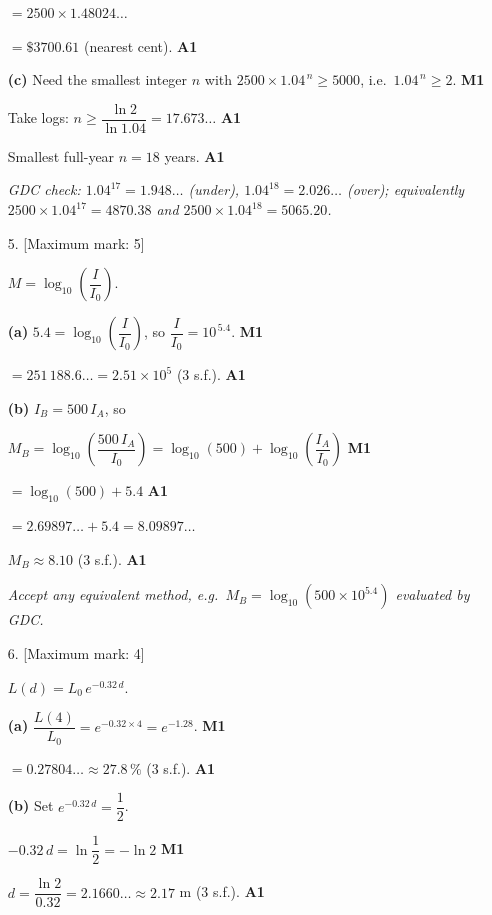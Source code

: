 \documentclass[12pt, twoside]{article}
\begin{document}
\begin{enumerate}[itemsep=0.3cm]
$= 2500 \times 1.48024\ldots$

$= \$3700.61$ (nearest cent). \hfill \textbf{A1}

\medskip

\textbf{(c)} Need the smallest integer $n$ with
$2500 \times 1.04^{\,n} \ge 5000$, i.e.\ $1.04^{\,n} \ge 2$.
\hfill \textbf{M1}

Take logs: $n \ge \dfrac{\ln 2}{\ln 1.04} = 17.673\ldots$
\hfill \textbf{A1}

Smallest full-year $n = 18$ years. \hfill \textbf{A1}

\emph{GDC check: $1.04^{17} = 1.948\ldots$ (under), $1.04^{18} =
2.026\ldots$ (over); equivalently $2500 \times 1.04^{17} = 4870.38$
and $2500 \times 1.04^{18} = 5065.20$.}

\newpage

\item[5.] [Maximum mark: 5]

$M = \log_{10}\!\left(\dfrac{I}{I_{0}}\right)$.

\medskip

\textbf{(a)} $5.4 = \log_{10}\!\left(\dfrac{I}{I_{0}}\right)$, so
$\dfrac{I}{I_{0}} = 10^{\,5.4}$. \hfill \textbf{M1}

$= 251\,188.6\ldots = 2.51 \times 10^{5}$ (3 s.f.).
\hfill \textbf{A1}

\medskip

\textbf{(b)} $I_{B} = 500\, I_{A}$, so

$M_{B} = \log_{10}\!\left(\dfrac{500\, I_{A}}{I_{0}}\right)
= \log_{10}(500) + \log_{10}\!\left(\dfrac{I_{A}}{I_{0}}\right)$
\hfill \textbf{M1}

$= \log_{10}(500) + 5.4$ \hfill \textbf{A1}

$= 2.69897\ldots + 5.4 = 8.09897\ldots$

$M_{B} \approx 8.10$ (3 s.f.). \hfill \textbf{A1}

\emph{Accept any equivalent method, e.g.\
$M_{B} = \log_{10}(500 \times 10^{5.4})$ evaluated by GDC.}

\newpage

\item[6.] [Maximum mark: 4]

$L(d) = L_{0}\, e^{-0.32\, d}$.

\medskip

\textbf{(a)} $\dfrac{L(4)}{L_{0}} = e^{-0.32 \times 4} = e^{-1.28}$.
\hfill \textbf{M1}

$= 0.27804\ldots \approx 27.8\,\%$ (3 s.f.). \hfill \textbf{A1}

\medskip

\textbf{(b)} Set $e^{-0.32\, d} = \dfrac{1}{2}$.

$-0.32\, d = \ln \dfrac{1}{2} = -\ln 2$ \hfill \textbf{M1}

$d = \dfrac{\ln 2}{0.32} = 2.1660\ldots \approx 2.17$ m (3 s.f.).
\hfill \textbf{A1}

\end{enumerate}
\end{document}

